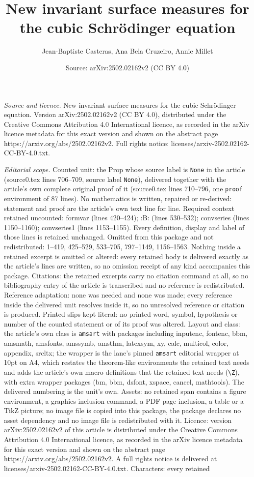 \documentclass[10pt,a4paper]{amsart}
\title[New invariant surface measures for the cubic Schr\"odinger e]{New invariant surface measures for the cubic Schr\"odinger equation}
\author{Jean-Baptiste Casteras, Ana Bela Cruzeiro, Annie Millet}
\date{Source: arXiv:2502.02162v2 (CC BY 4.0)}
\begin{document}
\maketitle

\noindent\emph{Source and licence.} New invariant surface measures for the cubic Schr\"odinger equation. Version arXiv:2502.02162v2 (CC BY 4.0), distributed under the Creative Commons Attribution 4.0 International licence, as recorded in the arXiv licence metadata for this exact version and shown on the abstract page https://arxiv.org/abs/2502.02162v2. Full rights notice: licenses/arxiv-2502.02162-CC-BY-4.0.txt.\par\smallskip

\noindent\textit{Editorial scope.} Counted unit: the Prop whose source label is \texttt{None} in the article (source0.tex lines 706--709, source label \texttt{None}), delivered together with the article's own complete original proof of it (source0.tex lines 710--796, one \texttt{proof} environment of 87 lines). No mathematics is written, repaired or re-derived: statement and proof are the article's own text line for line. Required context retained uncounted: formvar (lines 420--424); :B: (lines 530--532); convseries (lines 1150--1160); convseries1 (lines 1153--1155). Every definition, display and label of those lines is retained unchanged. Omitted from this package and not redistributed: 1--419, 425--529, 533--705, 797--1149, 1156--1563. Nothing inside a retained excerpt is omitted or altered: every retained body is delivered exactly as the article's lines are written, so no omission receipt of any kind accompanies this package. Citations: the retained excerpts carry no citation command at all, so no bibliography entry of the article is transcribed and no reference is redistributed. Reference adaptation: none was needed and none was made; every reference inside the delivered unit resolves inside it, so no unresolved reference or citation is produced. Printed slips kept literal: no printed word, symbol, hypothesis or number of the counted statement or of its proof was altered. Layout and class: the article's own class is \texttt{amsart} with packages including inputenc, fontenc, bbm, amsmath, amsfonts, amssymb, amsthm, latexsym, xy, calc, multicol, color, appendix, srcltx; the wrapper is the lane's pinned \texttt{amsart} editorial wrapper at 10pt on A4, which restates the theorem-like environments the retained text needs and adds the article's own macro definitions that the retained text needs (\texttt{\textbackslash Z}), with extra wrapper packages (bm, bbm, dsfont, xspace, cancel, mathtools). The delivered numbering is the unit's own. Assets: no retained span contains a figure environment, a graphics-inclusion command, a PDF-page inclusion, a table or a TikZ picture; no image file is copied into this package, the package declares no asset dependency and no image file is redistributed with it. Licence: version arXiv:2502.02162v2 of this article is distributed under the Creative Commons Attribution 4.0 International licence, as recorded in the arXiv licence metadata for this exact version and shown on the abstract page https://arxiv.org/abs/2502.02162v2. A full rights notice is delivered at licenses/arxiv-2502.02162-CC-BY-4.0.txt. Characters: every retained 
\end{document}
